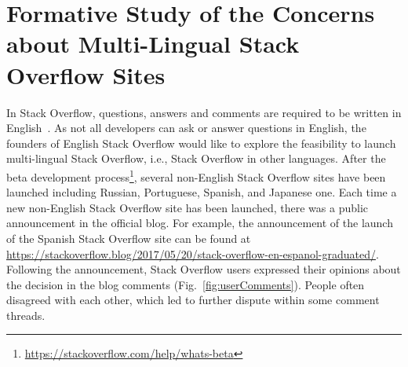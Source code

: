 \section{Formative Study of the Concerns about Multi-Lingual Stack Overflow Sites}
In Stack Overflow, questions, answers and comments are required to be written in English~\cite{web:SOenligsh}.
As not all developers can ask or answer questions in English, the founders of English Stack Overflow would like to explore the feasibility to launch multi-lingual Stack Overflow, i.e., Stack Overflow in other languages.
After the beta development process\footnote{\url{https://stackoverflow.com/help/whats-beta}}, several non-English Stack Overflow sites have been launched including Russian, Portuguese, Spanish, and Japanese one.
Each time a new non-English Stack Overflow site has been launched, there was a public announcement in the official blog.
For example, the announcement of the launch of the Spanish Stack Overflow site can be found at \url{https://stackoverflow.blog/2017/05/20/stack-overflow-en-espanol-graduated/}. 
Following the announcement, Stack Overflow users expressed their opinions about the decision in the blog comments (Fig.~\ref{fig:userComments}).
People often disagreed with each other, which led to further dispute within some comment threads.
\begin{comment}
\textcolor{red}{Furthermore, Stack Overflow users also have extensive discussions about the pros and cons of these multi-lingual Stack Overflow sites on Meta Stack Overflow and Meta Stack Exchange, such as~\cite{web:SOdiscussion1, web:SOdiscussion2, web:SOdiscussion3, web:SOdiscussion4, web:SOdiscussion5, SOdiscussion6}.
These meta sites are the places where users discuss the policies and practices of Stack Exchange sites.
Again, we can see arguments from both the supporting and against sides.
??Feel that if we mention them, then we also need to examine and code some to identify concerns. Otherwise, reviewers may say why just analyzes launch comments, but not these discussions. So better not mention them here?}
\end{comment}

